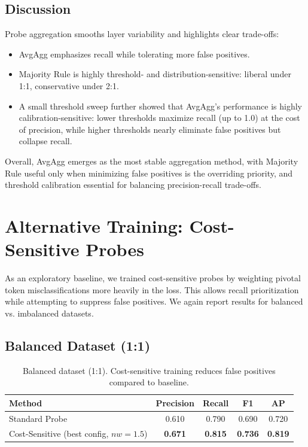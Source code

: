 \documentclass{article}
\begin{document}
\subsection{Discussion}
Probe aggregation smooths layer variability and highlights clear trade-offs:
\begin{itemize}
    \item AvgAgg emphasizes recall while tolerating more false positives.
    \item Majority Rule is highly threshold- and distribution-sensitive: liberal under 1:1, conservative under 2:1.
    \item A small threshold sweep further showed that AvgAgg’s performance is highly calibration-sensitive: lower thresholds maximize recall (up to 1.0) at the cost of precision, while higher thresholds nearly eliminate false positives but collapse recall.
\end{itemize}
Overall, AvgAgg emerges as the most stable aggregation method, with Majority Rule useful only when minimizing false positives is the overriding priority, and threshold calibration essential for balancing precision-recall trade-offs.

\section{Alternative Training: Cost-Sensitive Probes}

As an exploratory baseline, we trained cost-sensitive probes by weighting pivotal token misclassifications more heavily in the loss. This allows recall prioritization while attempting to suppress false positives. We again report results for balanced vs. imbalanced datasets.

\subsection{Balanced Dataset (1:1)}
\begin{table}[h!]
\centering
\begin{tabular}{lcccc}
\toprule
\textbf{Method} & \textbf{Precision} & \textbf{Recall} & \textbf{F1} & \textbf{AP} \\
\midrule
Standard Probe & 0.610 & 0.790 & 0.690 & 0.720 \\
Cost-Sensitive (best config, $nw=1.5$) & \textbf{0.671} & \textbf{0.815} & \textbf{0.736} & \textbf{0.819} \\
\bottomrule
\end{tabular}
\vspace{1em}
\caption{Balanced dataset (1:1). Cost-sensitive training reduces false positives compared to baseline.}
\end{table}
\end{document}
